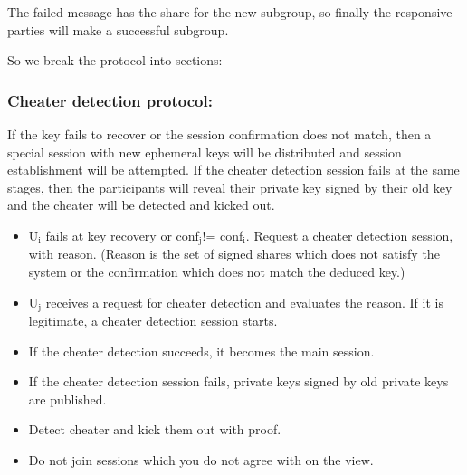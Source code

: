 \documentclass[11pt]{article}
\begin{document}
The failed message has the share for the new subgroup, so finally the responsive 
parties will make a successful subgroup.

So we break the protocol into sections:

\subsubsection{Cheater detection protocol:}
\label{sec-8-2-1}

   If the key fails to recover or the session confirmation does not match, then a special session with new ephemeral keys will be distributed and session establishment will be attempted. If the cheater detection session fails 
at the same stages, then the participants will reveal their private key signed by their old key and the cheater will be detected and kicked out.

\begin{itemize}
\item U$_{\text{i}}$ fails at key recovery or conf$_{\text{j}}$!= conf$_{\text{i}}$. Request a cheater detection session, with reason. (Reason is the set of signed shares which does not satisfy the system or the confirmation which does not match the deduced key.)
\item U$_{\text{j}}$ receives a request for cheater detection and evaluates the reason. If it is legitimate, a cheater detection session starts.
\item If the cheater detection succeeds, it becomes the main session.
\item If the cheater detection session fails, private keys signed by old private keys are published.
\item Detect cheater and kick them out with proof.
\item Do not join sessions which you do not agree with on the view.
\end{itemize}
\end{document}
